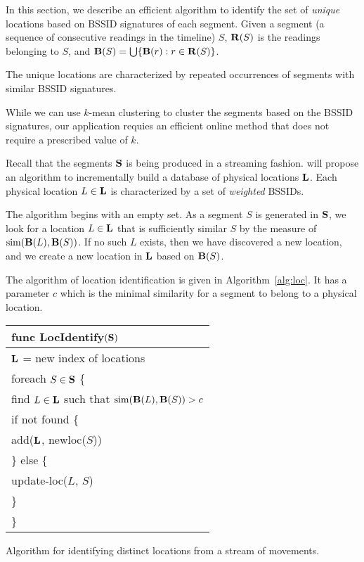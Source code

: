 In this section, we describe an efficient algorithm to identify the set of {\em
unique} locations based on BSSID signatures of each segment.  Given a segment (a
sequence of consecutive readings in the timeline) $S$, $\mathbf{R}(S)$ is the readings
belonging to $S$, and $\mathbf{B}(S) = \bigcup\{\mathbf{B}(r): r\in\mathbf{R}(S)\}$.

The unique locations are characterized by repeated occurrences of segments with
similar BSSID signatures.

While we can use $k$-mean clustering to cluster the segments based on the BSSID
signatures, our application requies an efficient online method that does not
require a prescribed value of $k$.

Recall that the segments $\mathbf{S}$ is being produced in a streaming fashion.  will
propose an algorithm to incrementally build a database of physical locations
$\mathbf{L}$.  Each physical location $L\in\mathbf{L}$ is characterized by a set of {\em
weighted} BSSIDs.

The algorithm begins with an empty set.  As a segment $S$ is generated in $\mathbf{S}$, we
look for a location $L\in\mathbf{L}$ that is sufficiently similar $S$ by the measure
of $\mathrm{sim}(\mathbf{B}(L), \mathbf{B}(S))$.  If no such $L$ exists, then we have
discovered a new location, and we create a new location in $\mathbf{L}$ based on $\mathbf{B}(S)$.

The algorithm of location identification is given in Algorithm~\ref{alg:loc}.
It has a parameter $c$ which is the minimal similarity for a segment to belong
to a physical location.

\begin{algorithm}[t]
\begin{tabular}{|l|} \hline
    func LocIdentify$(\mathbf{S})$ \\ \hline
    $\mathbf{L}$ = new index of locations \\
    foreach $S\in\mathbf{S}$ \{ \\
        \RRR find $L\in\mathbf{L}$ such that $\mathrm{sim}(\mathbf{B}(L), \mathbf{B}(S)) > c$ \\
        \RRR if not found \{ \\
        \RRR \RRR add($\mathbf{L}$, newloc($S$)) \\
        \RRR \} else \{ \\
            \RRR \RRR update-loc($L$, $S$) \\
        \RRR \} \\
    \}\\ \hline
\end{tabular}
\vspace{0.4cm}
\caption{Algorithm for identifying distinct locations from a stream of
movements.}
\label{alg:loc}
\end{algorithm}

